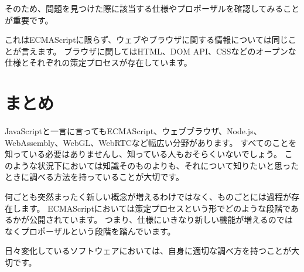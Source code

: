 そのため、問題を見つけた際に該当する仕様やプロポーザルを確認してみることが重要です。

これはECMAScriptに限らず、ウェブやブラウザに関する情報については同じことが言えます。
ブラウザに関してはHTML、DOM
API、CSSなどのオープンな仕様とそれぞれの策定プロセスが存在しています。

\hypertarget{ecmascript-summary}{%
\section{まとめ}\label{ecmascript-summary}}

JavaScriptと一言に言ってもECMAScript、ウェブブラウザ、Node.js、WebAssembly、WebGL、WebRTCなど幅広い分野があります。
すべてのことを知っている必要はありませんし、知っている人もおそらくいないでしょう。
このような状況下においては知識そのものよりも、それについて知りたいと思ったときに調べる方法を持っていることが大切です。

何ごとも突然まったく新しい概念が増えるわけではなく、ものごとには過程が存在します。
ECMAScriptにおいては策定プロセスという形でどのような段階であるかが公開されています。
つまり、仕様にいきなり新しい機能が増えるのではなくプロポーザルという段階を踏んでいます。

日々変化しているソフトウェアにおいては、自身に適切な調べ方を持つことが大切です。
